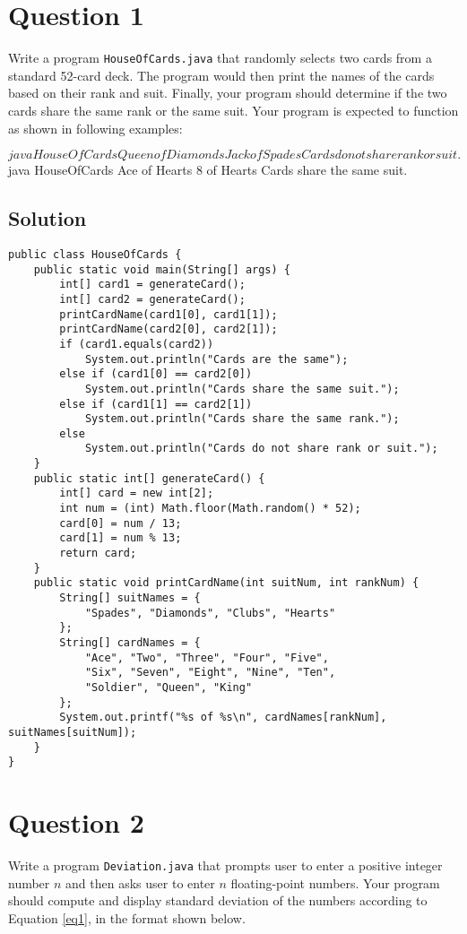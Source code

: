 \section*{Question 1}
Write a program \texttt{HouseOfCards.java} that randomly selects two cards from a standard 52-card deck.
The program would then print the names of the cards based on their rank and suit.
Finally, your program should determine if the two cards share the same rank or the same suit.
Your program is expected to function as shown in following examples:

\begin{terminal}
$ java HouseOfCards
Queen of Diamonds
Jack of Spades
Cards do not share rank or suit.
$ java HouseOfCards
Ace of Hearts
8 of Hearts
Cards share the same suit.
\end{terminal}

\subsection*{Solution}

\lstset{language=Java,tabsize=4}
\begin{lstlisting}
public class HouseOfCards {
	public static void main(String[] args) {
		int[] card1 = generateCard();
		int[] card2 = generateCard();
		printCardName(card1[0], card1[1]);
		printCardName(card2[0], card2[1]);
		if (card1.equals(card2))
			System.out.println("Cards are the same");
		else if (card1[0] == card2[0])
			System.out.println("Cards share the same suit.");
		else if (card1[1] == card2[1])
			System.out.println("Cards share the same rank.");
		else
			System.out.println("Cards do not share rank or suit.");
	}
	public static int[] generateCard() {
		int[] card = new int[2];
		int num = (int) Math.floor(Math.random() * 52);
		card[0] = num / 13;
		card[1] = num % 13;
		return card;
	}
	public static void printCardName(int suitNum, int rankNum) {
		String[] suitNames = {
			"Spades", "Diamonds", "Clubs", "Hearts"
		};
		String[] cardNames = {
			"Ace", "Two", "Three", "Four", "Five",
			"Six", "Seven", "Eight", "Nine", "Ten",
			"Soldier", "Queen", "King"
		};
		System.out.printf("%s of %s\n", cardNames[rankNum], suitNames[suitNum]);
	}
}
\end{lstlisting}

\section*{Question 2}
Write a program \texttt{Deviation.java} that prompts user to enter a positive integer number $n$ and then asks user to enter $n$ floating-point numbers.
Your program should compute and display standard deviation of the numbers according to Equation \ref{eq1}, in the format shown below.

